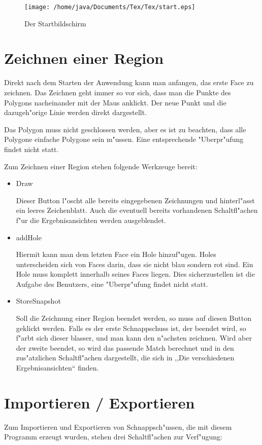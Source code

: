 \begin{figure}
   \centering
   \texttt{[image: /home/java/Documents/Tex/Tex/start.eps]}
   \caption{Der Startbildschirm}
   \label{fig:start}
\end{figure}

\section{Zeichnen einer Region}
Direkt nach dem Starten der Anwendung kann man anfangen, das erste Face zu zeichnen.  Das Zeichnen geht immer so vor sich, dass man die Punkte des Polygons nacheinander mit der Maus anklickt. Der neue Punkt und die dazugeh"orige Linie werden direkt dargestellt. 

Das Polygon muss nicht geschlossen werden, aber es ist zu beachten, dass alle Polygone einfache Polygone sein m"ussen. Eine entsprechende "Uberpr"ufung findet nicht statt.

Zum Zeichnen einer Region stehen folgende Werkzeuge bereit:
\begin{itemize}
\item Draw

Dieser Button l"oscht alle bereits eingegebenen Zeichnungen und hinterl"asst ein leeres Zeichenblatt. Auch die eventuell bereits vorhandenen Schaltfl"achen f"ur die Ergebnisansichten werden ausgeblendet.

\item addHole

Hiermit kann man dem letzten Face ein Hole hinzuf"ugen. Holes unterscheiden sich von Faces darin, dass sie nicht blau sondern rot sind. Ein Hole muss komplett innerhalb seines Faces liegen. Dies sicherzustellen ist die Aufgabe des Benutzers, eine "Uberpr"ufung findet nicht statt.

\item StoreSnapshot

Soll die Zeichnung einer Region beendet werden, so muss auf diesen Button geklickt werden. Falls es der erste Schnappschuss ist, der beendet wird, so f"arbt sich dieser blasser, und man  kann den n"achsten zeichnen. Wird aber der zweite beendet, so wird das passende Match berechnet und in den zus"atzlichen Schaltfl"achen dargestellt, die sich in ,,Die verschiedenen Ergebnisansichten`` finden.
\end{itemize} 

\section{Importieren / Exportieren}
Zum Importieren und Exportieren von Schnappsch"ussen, die mit diesem Programm erzeugt wurden, stehen drei Schaltfl"achen zur Verf"ugung:

